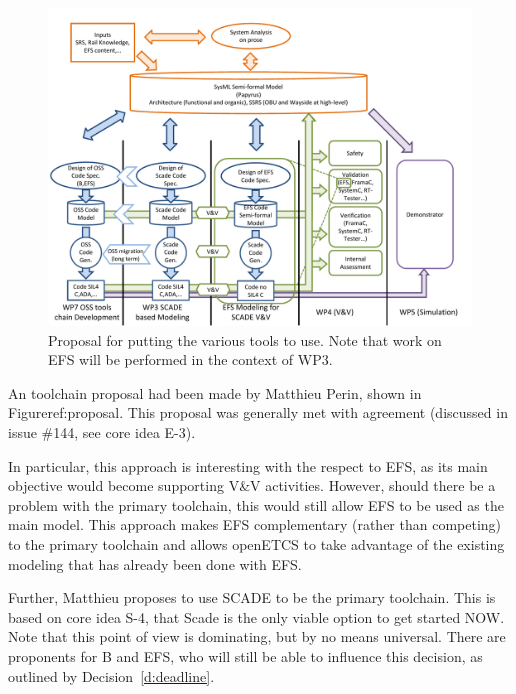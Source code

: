 \begin{figure}
  \centering
  \includegraphics[width=\linewidth]{images/2013_08_28_Toolchain_proposal.pdf}
  \caption{Proposal for putting the various tools to use.  Note that work on EFS will be performed in the context of WP3.}
  \label{fig:proposal}
\end{figure}

An toolchain proposal had been made by Matthieu Perin, shown in Figure{ref:proposal}.  This proposal was generally met with agreement (discussed in issue \#144, see core idea E-3).

In particular, this approach is interesting with the respect to EFS, as its main objective would become supporting V\&V activities.  However, should there be a problem with the primary toolchain, this would still allow EFS to be used as the main model.  This approach makes EFS complementary (rather than competing) to the primary toolchain and allows openETCS to take advantage of the existing modeling that has already been done with EFS.


Further, Matthieu proposes to use SCADE to be the primary toolchain.  This is based on core idea S-4, that Scade is the only viable option to get started NOW.  Note that this point of view is dominating, but by no means universal.  There are proponents for B and EFS, who will still be able to influence this decision, as outlined by Decision~\ref{d:deadline}.

